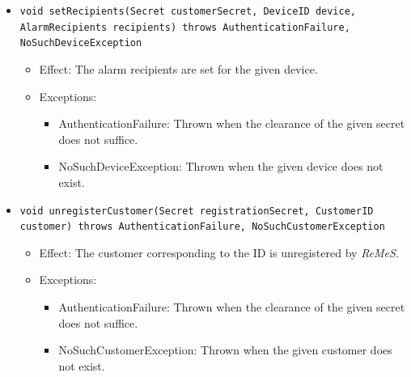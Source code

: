 \documentclass[a4paper,10pt]{article}
\newcommand{\rem}{\emph{ReMeS}\xspace}
\begin{document}
\begin{itemize}
\begin{itemize}
        \item \texttt{void setRecipients(Secret customerSecret, DeviceID device, AlarmRecipients recipients) throws AuthenticationFailure, NoSuchDeviceException}
        \begin{itemize}
        	\item Effect: The alarm recipients are set for the given device.
        	\item Exceptions:
            \begin{itemize}
            	\item AuthenticationFailure: Thrown when the clearance of the given secret does not suffice.
            	\item NoSuchDeviceException: Thrown when the given device does not exist.
            \end{itemize}
        \end{itemize}
        
        \item \texttt{void unregisterCustomer(Secret registrationSecret, CustomerID customer) throws AuthenticationFailure, NoSuchCustomerException}
        \begin{itemize}
            \item Effect: The customer corresponding to the ID is unregistered by \rem.
            \item Exceptions:
            \begin{itemize}
            	\item AuthenticationFailure: Thrown when the clearance of the given secret does not suffice.
                \item NoSuchCustomerException: Thrown when the given customer does not exist.
            \end{itemize}
        \end{itemize}
    \end{itemize}
    

\end{itemize}
\end{document}

